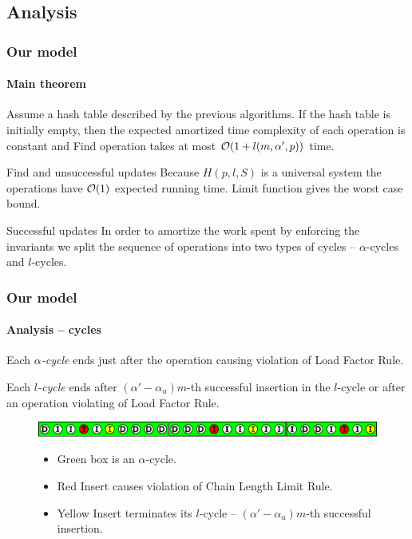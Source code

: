 \subsection{Analysis}
\begin{frame}
	\frametitle{Our model}
	\framesubtitle{Main theorem}
	
	\begin{theorem}
		Assume a hash table described by the previous algorithms.
		If the hash table is initially empty, then the expected amortized time complexity of each operation is constant and Find operation takes at most $\mathcal{O}(1 + l(m, \alpha', p))$ time.
	\end{theorem}
	
	\begin{block}{Find and unsuccessful updates}
		Because $H(p, l, S)$ is a universal system the operations have $\mathcal{O}(1)$ expected running time. Limit function gives the worst case bound.
	\end{block}
	
	\begin{block}{Successful updates}
		In order to amortize the work spent by enforcing the invariants we split the sequence of operations into two types of cycles -- $\alpha$-cycles and $l$-cycles.
	\end{block}
\end{frame}

\begin{frame}
	\frametitle{Our model}
	\framesubtitle{Analysis -- cycles}

	\begin{definition}
		Each \emph{$\alpha$-cycle} ends just after the operation causing violation of Load Factor Rule.
	\end{definition}

	\begin{definition}[$l$-cycle]
		Each \emph{$l$-cycle} ends after $(\alpha'-\alpha_u)m$-th successful insertion in the $l$-cycle or after an operation violating of Load Factor Rule.
	\end{definition}

	\begin{figure}
		\centering
		
		\includegraphics[width=0.9\linewidth]{cycles.pdf}
		\begin{itemize}
			\item Green box is an $\alpha$-cycle.
			\item Red Insert causes violation of Chain Length Limit Rule.
			\item Yellow Insert terminates its $l$-cycle -- $(\alpha'-\alpha_u)m$-th successful insertion.
		\end{itemize}
	\end{figure}
\end{frame}

